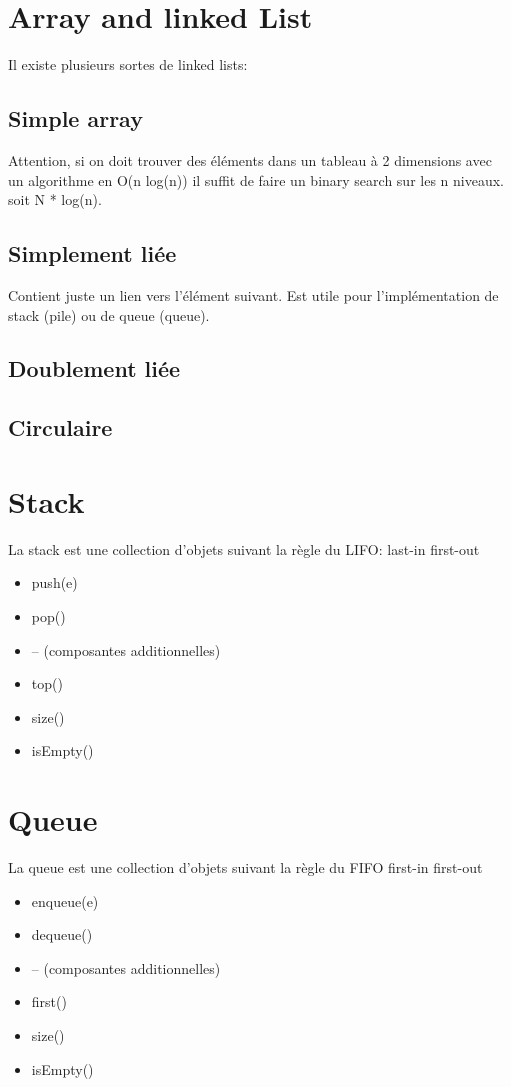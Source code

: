 \documentclass[a4paper]{article}
\begin{document}
\section{Array and linked List}

Il existe plusieurs sortes de linked lists:

\subsection{Simple array}
Attention, si on doit trouver des éléments dans un tableau à 2 dimensions avec un algorithme en O(n log(n)) il suffit de faire un binary search sur les n niveaux. soit N * log(n).

\subsection{Simplement liée}
Contient juste un lien vers l'élément suivant.
Est utile pour l'implémentation de stack (pile) ou de queue (queue).
\subsection{Doublement liée}
\subsection{Circulaire}


\section{Stack}
La stack est une collection d'objets suivant la règle du LIFO:
last-in first-out

\begin{itemize}
\item push(e)
\item pop()
\item  -- (composantes additionnelles)
\item top()
\item size()
\item isEmpty()
\end{itemize}
\section{Queue}
La queue est une collection d'objets suivant la règle du FIFO
first-in first-out

\begin{itemize}
\item enqueue(e)
\item dequeue()
\item  -- (composantes additionnelles)
\item  first()
\item  size()
\item  isEmpty()
\end{itemize}
\end{document}
